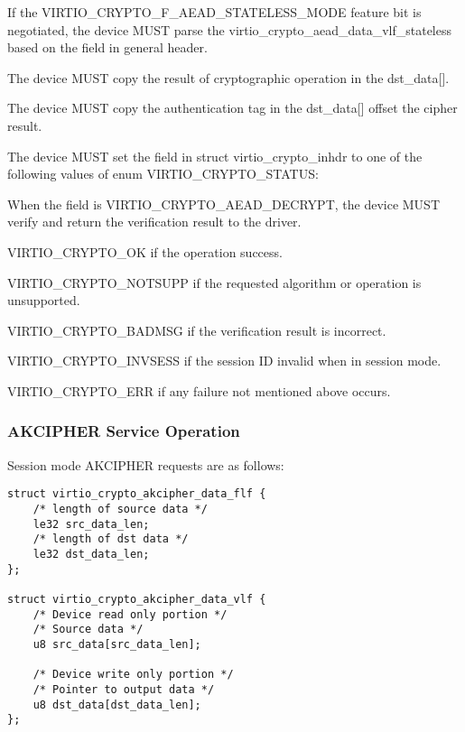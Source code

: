 
\begin{itemize*}
\item If the VIRTIO_CRYPTO_F_AEAD_STATELESS_MODE feature bit is negotiated, the
    device MUST parse the virtio_crypto_aead_data_vlf_stateless based on the 
	field in general header.
\item The device MUST copy the result of cryptographic operation in the dst_data[].
\item The device MUST copy the authentication tag in the dst_data[] offset the cipher result.
\item The device MUST set the  field in struct virtio_crypto_inhdr to
    one of the following values of enum VIRTIO_CRYPTO_STATUS:
\item When the  field is VIRTIO_CRYPTO_AEAD_DECRYPT, the device MUST
    verify and return the verification result to the driver.
\begin{itemize*}
\item VIRTIO_CRYPTO_OK if the operation success.
\item VIRTIO_CRYPTO_NOTSUPP if the requested algorithm or operation is unsupported.
\item VIRTIO_CRYPTO_BADMSG if the verification result is incorrect.
\item VIRTIO_CRYPTO_INVSESS if the session ID invalid when in session mode.
\item VIRTIO_CRYPTO_ERR if any failure not mentioned above occurs.
\end{itemize*}
\end{itemize*}

\subsubsection{AKCIPHER Service Operation}\label{sec:Device Types / Crypto Device / Device Operation / AKCIPHER Service Operation}

Session mode AKCIPHER requests are as follows:

\begin{lstlisting}
struct virtio_crypto_akcipher_data_flf {
    /* length of source data */
    le32 src_data_len;
    /* length of dst data */
    le32 dst_data_len;
};

struct virtio_crypto_akcipher_data_vlf {
    /* Device read only portion */
    /* Source data */
    u8 src_data[src_data_len];

    /* Device write only portion */
    /* Pointer to output data */
    u8 dst_data[dst_data_len];
};
\end{lstlisting}

